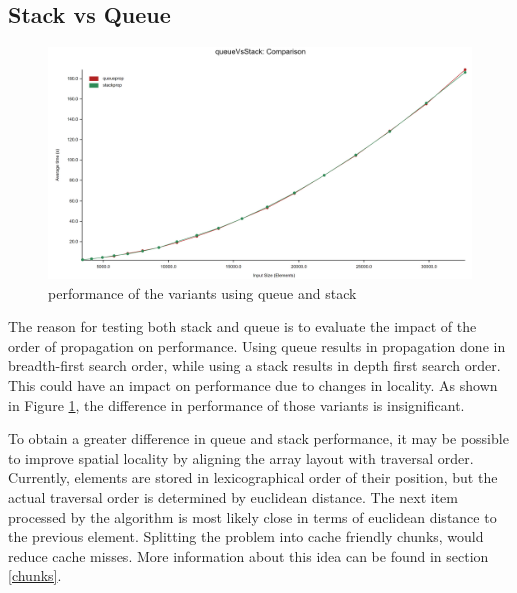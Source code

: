 \documentclass[shortabstract, english, inz]{iithesis}
\begin{document}
\subsection{Stack vs Queue}
\begin{figure}[H]
\centering
\includegraphics[width=1\textwidth, angle=0]{images/queue_vs_stack_performance.png}
\caption{performance of the variants using queue and stack}
\label{fig:stack_vs_queue}
\end{figure}
\label{stack_vs_queue}
The reason for testing both stack and queue is to evaluate the impact of the order of propagation on performance. Using queue results in propagation done in breadth-first search order, while using a stack results in depth first search order. This could have an impact on performance due to changes in locality. As shown in Figure \ref{fig:stack_vs_queue}, the difference in performance of those variants is insignificant.

To obtain a greater difference in queue and stack performance, it may be possible to improve spatial locality by aligning the array layout with traversal order. Currently, elements are stored in lexicographical order of their position, but the actual traversal order is determined by euclidean distance. The next item processed by the algorithm is most likely close in terms of euclidean distance to the previous element. Splitting the problem into cache friendly chunks, would reduce cache misses. More information about this idea can be found in section \ref{chunks}.
\end{document}

